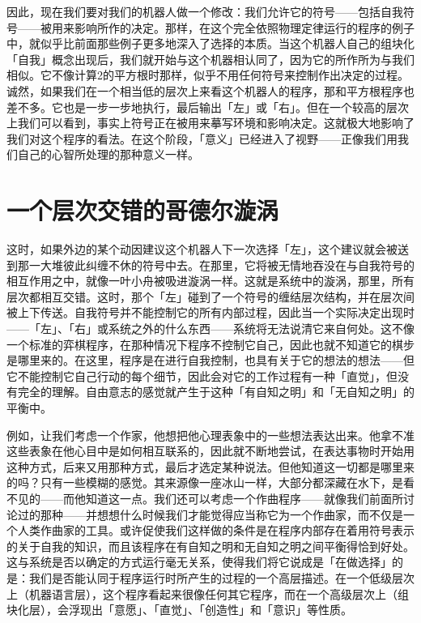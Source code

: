 \documentclass[
  12pt,
  twoside,
  openright,
  oldfontcommands,
]{memoir}
\begin{document}
因此，现在我们要对我们的机器人做一个修改：我们允许它的符号------包括自我符号------被用来影响所作的决定。那样，在这个完全依照物理定律运行的程序的例子中，就似乎比前面那些例子更多地深入了选择的本质。当这个机器人自己的组块化「自我」概念出现后，我们就开始与这个机器相认同了，因为它的所作所为与我们相似。它不像计算2的平方根时那样，似乎不用任何符号来控制作出决定的过程。诚然，如果我们在一个相当低的层次上来看这个机器人的程序，那和平方根程序也差不多。它也是一步一步地执行，最后输出「左」或「右」。但在一个较高的层次上我们可以看到，事实上符号正在被用来摹写环境和影响决定。这就极大地影响了我们对这个程序的看法。在这个阶段，「意义」已经进入了视野------正像我们用我们自己的心智所处理的那种意义一样。

\section{一个层次交错的哥德尔漩涡}

这时，如果外边的某个动因建议这个机器人下一次选择「左」，这个建议就会被送到那一大堆彼此纠缠不休的符号中去。在那里，它将被无情地吞没在与自我符号的相互作用之中，就像一叶小舟被吸进漩涡一样。这就是系统中的漩涡，那里，所有层次都相互交错。这时，那个「左」碰到了一个符号的缠结层次结构，并在层次间被上下传送。自我符号并不能控制它的所有内部过程，因此当一个实际决定出现时------「左」、「右」或系统之外的什么东西------系统将无法说清它来自何处。这不像一个标准的弈棋程序，在那种情况下程序不控制它自己，因此也就不知道它的棋步是哪里来的。在这里，程序是在进行自我控制，也具有关于它的想法的想法------但它不能控制它自己行动的每个细节，因此会对它的工作过程有一种「直觉」，但没有完全的理解。自由意志的感觉就产生于这种「有自知之明」和「无自知之明」的平衡中。

例如，让我们考虑一个作家，他想把他心理表象中的一些想法表达出来。他拿不准这些表象在他心目中是如何相互联系的，因此就不断地尝试，在表达事物时开始用这种方式，后来又用那种方式，最后才选定某种说法。但他知道这一切都是哪里来的吗？只有一些模糊的感觉。其来源像一座冰山一样，大部分都深藏在水下，是看不见的------而他知道这一点。我们还可以考虑一个作曲程序------就像我们前面所讨论过的那种------并想想什么时候我们才能觉得应当称它为一个作曲家，而不仅是一个人类作曲家的工具。或许促使我们这样做的条件是在程序内部存在着用符号表示的关于自我的知识，而且该程序在有自知之明和无自知之明之间平衡得恰到好处。这与系统是否以确定的方式运行毫无关系，使得我们将它说成是「在做选择」的是：我们是否能认同于程序运行时所产生的过程的一个高层描述。在一个低级层次上（机器语言层），这个程序看起来很像任何其它程序，而在一个高级层次上（组块化层），会浮现出「意愿」、「直觉」、「创造性」和「意识」等性质。
\end{document}
